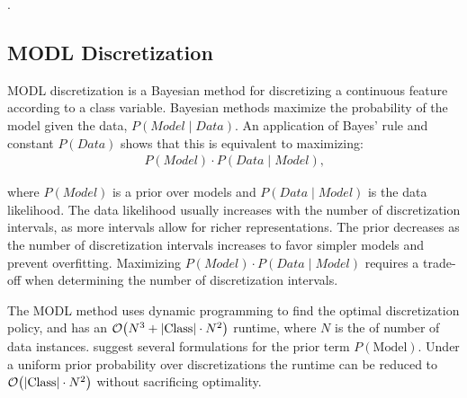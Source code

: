 .

\subsection{MODL Discretization}
MODL discretization \citep{Boulle_2006} is a Bayesian method for discretizing a continuous feature according to a class variable. Bayesian methods maximize the probability of the model given the data, $P(\textit{Model} \mid \textit{Data})$. An application of Bayes' rule and constant $P(\textit{Data})$ shows that this is equivalent to maximizing:
\begin{align}
P(\textit{Model}) \cdot P(\textit{Data} \mid \textit{Model})\text{,}
\end{align}

\noindent
where $P(\textit{Model})$ is a prior over models and ${P(\textit{Data} \mid \textit{Model})}$ is the data likelihood.
The data likelihood usually increases with the number of discretization intervals, as more intervals allow for richer representations.
The prior decreases as the number of discretization intervals increases to favor simpler models and prevent overfitting.
Maximizing ${P(\textit{Model}) \cdot P(\textit{Data} \mid \textit{Model})}$ requires a trade-off when determining the number of discretization intervals.

The MODL method uses dynamic programming to find the optimal discretization policy, and has an $\bigo\paren{N^3 + |\text{Class}| \cdot N^2}$ runtime, where $N$ is the of number of data instances.
\cite{Lustgarten_2011} suggest several formulations for the prior term $P(\text{Model})$.
Under a uniform prior probability over discretizations the runtime can be reduced to $\bigo\paren{|\text{Class}| \cdot N^2}$ without sacrificing optimality.

